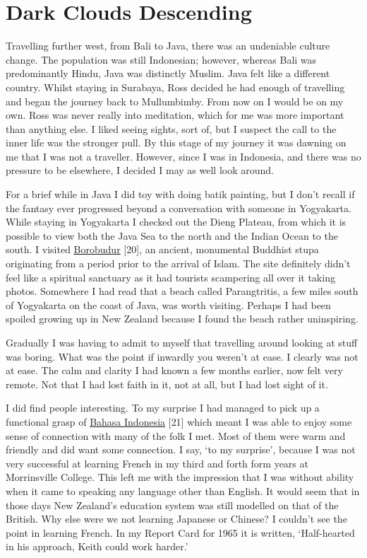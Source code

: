\chapter{Dark Clouds Descending}

Travelling further west, from Bali to Java, there was an undeniable
culture change. The population was still Indonesian; however, whereas
Bali was predominantly Hindu, Java was distinctly Muslim. Java felt like
a different country. Whilst staying in Surabaya, Ross decided he had
enough of travelling and began the journey back to Mullumbimby. From now
on I would be on my own. Ross was never really into meditation, which
for me was more important than anything else. I liked seeing sights,
sort of, but I suspect the call to the inner life was the stronger pull.
By this stage of my journey it was dawning on me that I was not a
traveller. However, since I was in Indonesia, and there was no pressure
to be elsewhere, I decided I may as well look around.

For a brief while in Java I did toy with doing batik painting, but I
don't recall if the fantasy ever progressed beyond a conversation with
someone in Yogyakarta. While staying in Yogyakarta I checked out the
Dieng Plateau, from which it is possible to view both the Java Sea to
the north and the Indian Ocean to the south. I visited
\underline{\href{https://en.wikipedia.org/wiki/Borobudur}{Borobudur}}
{[}20{]}, an ancient, monumental Buddhist stupa originating from a
period prior to the arrival of Islam. The site definitely didn't feel
like a spiritual sanctuary as it had tourists scampering all over it
taking photos. Somewhere I had read that a beach called Parangtritis, a
few miles south of Yogyakarta on the coast of Java, was worth visiting.
Perhaps I had been spoiled growing up in New Zealand because I found the
beach rather uninspiring.

Gradually I was having to admit to myself that travelling around looking
at stuff was boring. What was the point if inwardly you weren't at ease.
I clearly was not at ease. The calm and clarity I had known a few months
earlier, now felt very remote. Not that I had lost faith in it, not at
all, but I had lost sight of it.

I did find people interesting. To my surprise I had managed to pick up a
functional grasp of
\href{https://en.wikipedia.org/wiki/Indonesian_language}{\underline{Bahasa
Indonesia}} {[}21{]} which meant I was able to enjoy some sense of
connection with many of the folk I met. Most of them were warm and
friendly and did want some connection. I say, `to my surprise', because
I was not very successful at learning French in my third and forth form
years at Morrinsville College. This left me with the impression that I
was without ability when it came to speaking any language other than
English. It would seem that in those days New Zealand's education system
was still modelled on that of the British. Why else were we not learning
Japanese or Chinese? I couldn't see the point in learning French. In my
Report Card for 1965 it is written, `Half-hearted in his approach, Keith
could work harder.'

